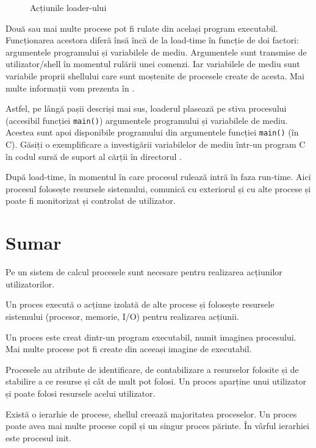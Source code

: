 \begin{figure}[!htbp]
  \centering
  \def\svgwidth{0.8\textwidth}
  
  \caption{Acțiunile loader-ului}
  \label{fig:process:loader}
\end{figure}

Două sau mai multe procese pot fi rulate din același program executabil.
Funcționarea acestora diferă însă încă de la load-time în funcție de doi
factori: argumentele programului și variabilele de mediu. Argumentele sunt
transmise de utilizator/shell în momentul rulării unei comenzi. Iar variabilele
de mediu sunt variabile proprii shellului care sunt moștenite de procesele
create de acesta. Mai multe informații vom prezenta în .

Astfel, pe lângă pașii descriși mai sus, loaderul plasează pe stiva procesului
(accesibil funcției \texttt{main()}) argumentele programului și variabilele de mediu.
Acestea sunt apoi disponibile programului din argumentele funcției \texttt{main()} (în C). Găsiți o exemplificare a investigării variabilelor de mediu într-un program C în codul sursă de suport al cărții în directorul .

După load-time, în momentul în care procesul rulează intră în faza run-time.
Aici procesul folosește resursele sistemului, comunică cu exteriorul și cu alte
procese și poate fi monitorizat și controlat de utilizator.

\section{Sumar}
\label{sec:process:summary}

Pe un sistem de calcul procesele sunt necesare pentru realizarea acțiunilor
utilizatorilor.

Un proces execută o acțiune izolată de alte procese și folosește resursele
sistemului (procesor, memorie, I/O) pentru realizarea acțiunii.

Un proces este creat dintr-un program executabil, numit imaginea procesului. Mai
multe procese pot fi create din aceeași imagine de executabil.

Procesele au atribute de identificare, de contabilizare a resurselor folosite și
de stabilire a ce resurse și cât de mult pot folosi. Un proces aparține unui
utilizator și poate folosi resursele acelui utilizator.

Există o ierarhie de procese, shellul creează majoritatea proceselor. Un proces
poate avea mai multe procese copil și un singur proces părinte. În vârful
ierarhiei este procesul init.

